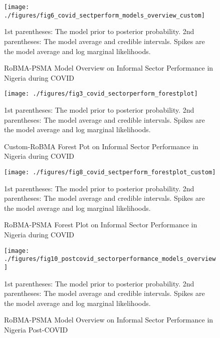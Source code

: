 \documentclass[12pt, english]{article}
\begin{document}
    \begin{figure}[H]
        \centering
        \texttt{[image: ./figures/fig6\_covid\_sectperform\_models\_overview\_custom]}
        \caption{RoBMA-PSMA Model Overview on Informal Sector Performance in Nigeria during COVID}
        \label{fig15:custom-robma-model-overview-covid}
        \begin{minipage}{10cm}
            \vspace{0.1cm}
            \small 1st parentheses: The model prior to posterior probability. 2nd parentheses: The model average and credible intervals. Spikes are the model average and log marginal likelihoods.
        \end{minipage}
    \end{figure}

    \begin{figure}[H]
        \centering
        \texttt{[image: ./figures/fig3\_covid\_sectorperform\_forestplot]}
        \caption{Custom-RoBMA Forest Pot on Informal Sector Performance in Nigeria during COVID}
        \label{fig16:robma-psma-forest-plot-covid}
        \begin{minipage}{10cm}
            \vspace{0.1cm}
            \small 1st parentheses: The model prior to posterior probability. 2nd parentheses: The model average and credible intervals. Spikes are the model average and log marginal likelihoods.
        \end{minipage}
    \end{figure}

    \begin{figure}[H]
        \centering
        \texttt{[image: ./figures/fig8\_covid\_sectperform\_forestplot\_custom]}
        \caption{RoBMA-PSMA Forest Plot on Informal Sector Performance in Nigeria during COVID}
        \label{fig17:custom-robma-forest-plot-covid}
        \begin{minipage}{10cm}
            \vspace{0.1cm}
            \small 1st parentheses: The model prior to posterior probability. 2nd parentheses: The model average and credible intervals. Spikes are the model average and log marginal likelihoods.
        \end{minipage}
    \end{figure}

    \begin{figure}[H]
        \centering
        \texttt{[image: ./figures/fig10\_postcovid\_sectorperformance\_models\_overview]}
        \caption{RoBMA-PSMA Model Overview on Informal Sector Performance in Nigeria Post-COVID}
        \label{fig18:robma-psma-model-overview-postcovid}
        \begin{minipage}{10cm}
            \vspace{0.1cm}
            \small 1st parentheses: The model prior to posterior probability. 2nd parentheses: The model average and credible intervals. Spikes are the model average and log marginal likelihoods.
        \end{minipage}
    \end{figure}
\end{document}
